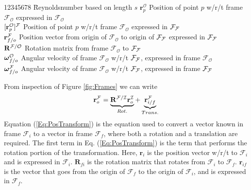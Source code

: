 \begin{tabbing}
%
12345678 \= Reynoldsnumber based on length $s$ \kill
$\mathbf{r}^{\mathcal{O}}_{p}$        \> Position of point $p$ w/r/t frame $\mathcal{F}_\mathcal{O}$
                               expressed in  $\mathcal{F}_\mathcal{O}$ \\
%
$[\mathbf{r}^{\mathcal{O}}_{p} ]^{\mathcal{F}}$      \> Position of point $p$ w/r/t frame $\mathcal{F}_\mathcal{O}$
                                   expressed in $\mathcal{F}_{\mathcal{F}}$   \\
%
$\mathbf{r}_{f/o}^{\mathcal{F}}$        \> Position vector from origin of $\mathcal{F}_\mathcal{O}$ to origin
                         of $\mathcal{F}_{\mathcal{F}}$ expressed in $\mathcal{F}_{\mathcal{F}}$  \\
%
$\mathbf{R}^{\mathcal{F}/\mathcal{O}}$      \> Rotation matrix from frame $\mathcal{F}_\mathcal{O}$ to $\mathcal{F}_{\mathcal{F}}$\\
%
$\mbox{\boldmath{$\omega $}}_{f/o}^\mathcal{O}$   \>  Angular velocity of frame
$\mathcal{F}_\mathcal{O}$ w/r/t $\mathcal{F}_{\mathcal{F}}$,   expressed in frame
$\mathcal{F}_\mathcal{O}$ \\
%
$\mbox{\boldmath{$\omega $}}_{f/o}^{\mathcal{F}}$   \>  Angular velocity of
frame $\mathcal{F}_\mathcal{O}$ w/r/t $\mathcal{F}_{\mathcal{F}}$,  expressed in
frame
$\mathcal{F}_{\mathcal{F}}$ \\
\end{tabbing}




From inspection of Figure \ref{fig:Frames} we can write
%
\begin{equation}
      \mathbf{r}_{o}^{\mathcal{F}} = \underbrace{\mathbf{R}^{\mathcal{F}/\mathcal{I}}\mathbf{r}_{o}^{\mathcal{I}}}_{Rot.} +
     \underbrace{  \mathbf{r}_{i/f}^{\mathcal{F}}}_{Trans.}
     \label{Eq:PosTransform}
\end{equation}
%
Equation (\ref{Eq:PosTransform}) is the equation used to convert a
vector known in frame $\mathcal{F}_i$ to a vector in frame
$\mathcal{F}_f$, where both a rotation and a translation are
required.  The first term in Eq. (\ref{Eq:PosTransform}) is the
term that performs the rotation portion of the transformation.
Here, $\mathbf{r}_{i}$ is the position vector w/r/t to
$\mathcal{F}_i$ and is expressed in $\mathcal{F}_i$.
$\mathbf{R}_{fi}$ is the rotation matrix that rotates from
$\mathcal{F}_i$ to $\mathcal{F}_f$.   $\mathbf{r}_{if}$ is the
vector that goes from the origin of $\mathcal{F}_f$ to the origin
of $\mathcal{F}_i$, and is expressed in $\mathcal{F}_f$.

